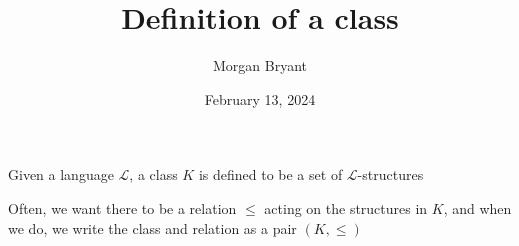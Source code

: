 \documentclass[a4paper]{article}
\title{Definition of a class}
\date{February 13, 2024}
\author{Morgan Bryant}
\begin{document}
\maketitle
\par{Given a language \(\mathcal {L}\), a class \(K\) is defined to be a set of \(\mathcal {L}\)-structures}\par{Often, we want there to be a relation \(\leq\) acting on the structures in \(K\), and when we do, we write the class and relation as a pair \((K,  \leq )\)}
\printbibliography
\end{document}
